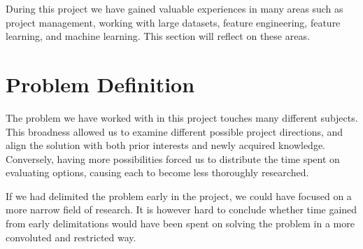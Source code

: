 
During this project we have gained valuable experiences in many areas such as project management, working with large datasets, feature engineering, feature learning, and machine learning. This section will reflect on these areas.

\section{Problem Definition}
The problem we have worked with in this project touches many different subjects. This broadness allowed us to examine different possible project directions, and align the solution with both prior interests and newly acquired knowledge. Conversely, having more possibilities forced us to distribute the time spent on evaluating options, causing each to become less thoroughly researched. 

If we had delimited the problem early in the project, we could have focused on a more narrow field of research. It is however hard to conclude whether time gained from early delimitations would have been spent on solving the problem in a more convoluted and restricted way.


